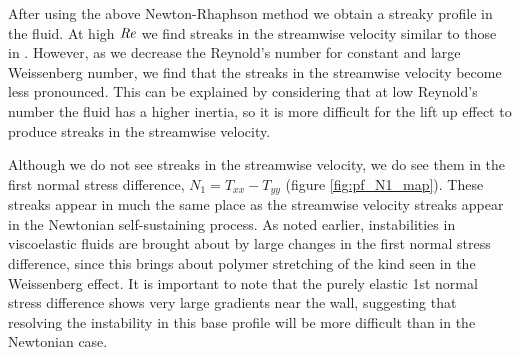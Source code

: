 \documentclass{jfm}
\newcommand\Rey{\mbox{\textit{Re}}}  %
\begin{document}
After using the above Newton-Rhaphson method we obtain a streaky profile in the
fluid. At high $\Rey$ we find streaks in the streamwise velocity similar to
those in \cite{Waleffe1997}. However, as we decrease the Reynold's number for
constant and large Weissenberg number, we find that the streaks in the
streamwise velocity become less pronounced. This can be explained by
considering that at low Reynold's number the fluid has a higher inertia, so it
is more difficult for the lift up effect to produce streaks in the streamwise
velocity. 

Although we do not see streaks in the streamwise velocity, we do see them in
the first normal stress difference, $N_{1} = T_{xx} - T_{yy}$ (figure
\ref{fig:pf_N1_map}). These streaks appear in much the same place as the
streamwise velocity streaks appear in the Newtonian self-sustaining process. As
noted earlier, instabilities in viscoelastic fluids are brought about by large
changes in the first normal stress difference, since this brings about polymer
stretching of the kind seen in the Weissenberg effect. It is important to note
that the purely elastic 1st normal stress difference shows very large gradients
near the wall, suggesting that resolving the instability in this base profile
will be more difficult than in the Newtonian case.

\end{document}
